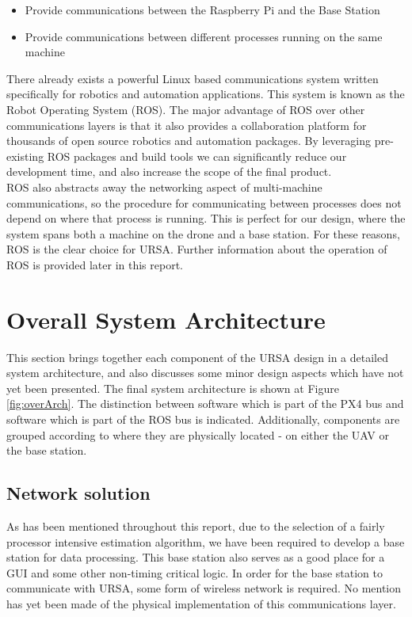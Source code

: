 \documentclass[capstone_report.tex]{subfiles}
\begin{document}
\begin{itemize}
	\item Provide communications between the Raspberry Pi and the Base Station
	\item Provide communications between different processes running on the same machine 
\end{itemize}

There already exists a powerful Linux based communications system written specifically for robotics and automation applications. This system is known as the Robot Operating System (ROS). The major advantage of ROS over other communications layers is that it also provides a collaboration platform for thousands of open source robotics and automation packages. By leveraging pre-existing ROS packages and build tools we can significantly reduce our development time, and also increase the scope of the final product. \\

ROS also abstracts away the networking aspect of multi-machine communications, so the procedure for communicating between processes does not depend on where that process is running. This is perfect for our design, where the system spans both a machine on the drone and a base station. For these reasons, ROS is the clear choice for URSA. Further information about the operation of ROS is provided later in this report.

\section{Overall System Architecture}
This section brings together each component of the URSA design in a detailed system architecture, and also discusses some minor design aspects which have not yet been presented. The final system architecture is shown at Figure \ref{fig:overArch}. The distinction between software which is part of the PX4 bus and software which is part of the ROS bus is indicated. Additionally, components are grouped according to where they are physically located - on either the UAV or the base station. 

\subsection{Network solution}
As has been mentioned throughout this report, due to the selection of a fairly processor intensive estimation algorithm, we have been required to develop a base station for data processing. This base station also serves as a good place for a GUI and some other non-timing critical logic. In order for the base station to communicate with URSA, some form of wireless network is required. No mention has yet been made of the physical implementation of this communications layer.\\
\end{document}
